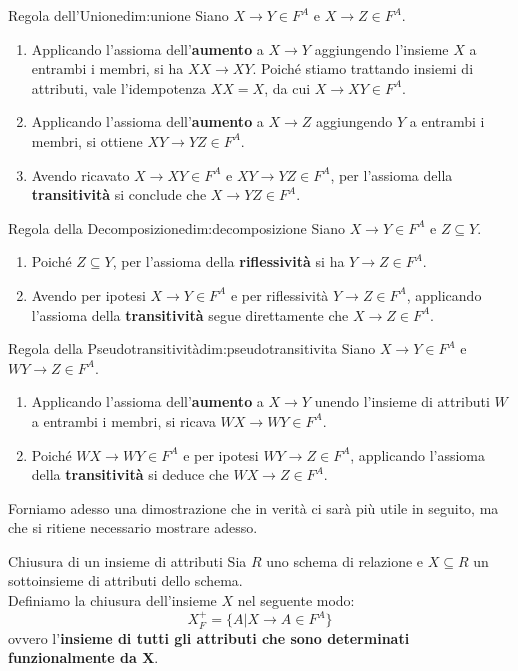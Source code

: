 \documentclass[12pt]{report}
\newcommand{\ra}{
	\rightarrow
}
\begin{document}
	\begin{dimostrazione}{Regola dell'Unione}{dim:unione}
		Siano $X \to Y \in F^A$ e $X \to Z \in F^A$.
		\begin{enumerate}
			\item Applicando l'assioma dell'\textbf{aumento} a $X \to Y$ aggiungendo l'insieme $X$ a entrambi i membri, si ha $XX \to XY$. Poiché stiamo trattando insiemi di attributi, vale l'idempotenza $XX = X$, da cui $X \to XY \in F^A$.
			\item Applicando l'assioma dell'\textbf{aumento} a $X \to Z$ aggiungendo $Y$ a entrambi i membri, si ottiene $XY \to YZ \in F^A$.
			\item Avendo ricavato $X \to XY \in F^A$ e $XY \to YZ \in F^A$, per l'assioma della \textbf{transitività} si conclude che $X \to YZ \in F^A$.
		\end{enumerate}
	\end{dimostrazione}
	
	\begin{dimostrazione}{Regola della Decomposizione}{dim:decomposizione}
		Siano $X \to Y \in F^A$ e $Z \subseteq Y$.
		\begin{enumerate}
			\item Poiché $Z \subseteq Y$, per l'assioma della \textbf{riflessività} si ha $Y \to Z \in F^A$.
			\item Avendo per ipotesi $X \to Y \in F^A$ e per riflessività $Y \to Z \in F^A$, applicando l'assioma della \textbf{transitività} segue direttamente che $X \to Z \in F^A$.
		\end{enumerate}
	\end{dimostrazione}
	
	\begin{dimostrazione}{Regola della Pseudotransitività}{dim:pseudotransitivita}
		Siano $X \to Y \in F^A$ e $WY \to Z \in F^A$.
		\begin{enumerate}
			\item Applicando l'assioma dell'\textbf{aumento} a $X \to Y$ unendo l'insieme di attributi $W$ a entrambi i membri, si ricava $WX \to WY \in F^A$.
			\item Poiché $WX \to WY \in F^A$ e per ipotesi $WY \to Z \in F^A$, applicando l'assioma della \textbf{transitività} si deduce che $WX \to Z \in F^A$.
		\end{enumerate}
	\end{dimostrazione}
	
	Forniamo adesso una dimostrazione che in verità ci sarà più utile in seguito, ma che si ritiene necessario mostrare adesso.
	\begin{definizione}{Chiusura di un insieme di attributi}{}
		Sia $R$ uno schema di relazione e $X \subseteq R$ un sottoinsieme di attributi dello schema.\\
		Definiamo la chiusura dell'insieme $X$ nel seguente modo:
		\[
			X^+_F = \{A | X \ra A \in F^A\}
		\]
		ovvero l'\textbf{insieme di tutti gli attributi che sono determinati funzionalmente da X}.
	\end{definizione}
	
\end{document}
